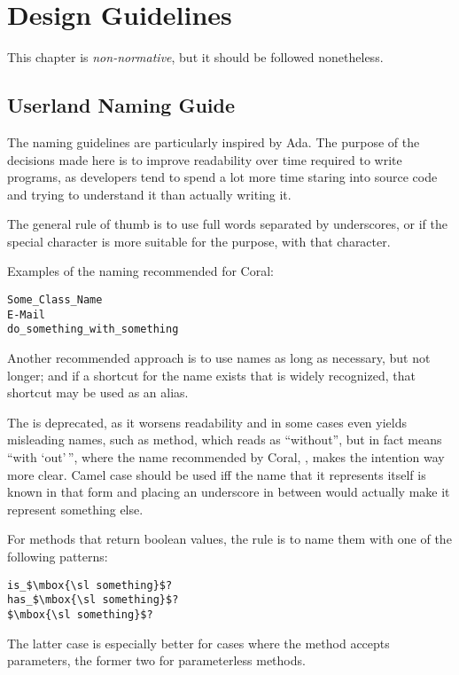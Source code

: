 
\chapter{Design Guidelines}

This chapter is {\em non-normative}, but it should be followed nonetheless. 

\section{Userland Naming Guide}

The naming guidelines are particularly inspired by Ada. The purpose of the decisions made here is to improve readability over time required to write programs, as developers tend to spend a lot more time staring into source code and trying to understand it than actually writing it. 

The general rule of thumb is to use full words separated by underscores, or if the special character is more suitable for the purpose, with that character. 

\example Examples of the naming recommended for Coral:
\begin{lstlisting}
Some_Class_Name
E-Mail
do_something_with_something
\end{lstlisting}

Another recommended approach is to use names as long as necessary, but not longer; and if a shortcut for the name exists that is widely recognized, that shortcut may be used as an alias. 

The  is deprecated, as it worsens readability and in some cases even yields misleading names, such as  method, which reads as ``without'', but in fact means ``with `out'\,'', where the name recommended by Coral, , makes the intention way more clear. Camel case should be used iff the name that it represents itself is known in that form and placing an underscore in between would actually make it represent something else. 

For methods that return boolean values, the rule is to name them with one of the following patterns:
\begin{lstlisting}
is_$\mbox{\sl something}$?
has_$\mbox{\sl something}$?
$\mbox{\sl something}$?
\end{lstlisting}
The latter case is especially better for cases where the method accepts parameters, the former two for parameterless methods. 

